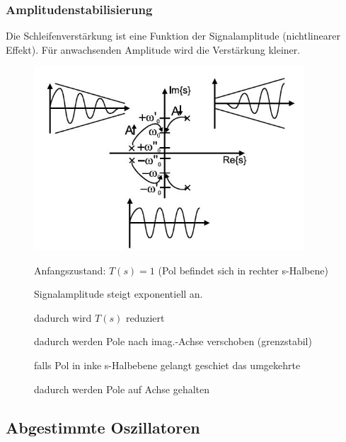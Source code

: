 \subsubsection{Amplitudenstabilisierung}
Die Schleifenverstärkung ist eine Funktion der Signalamplitude (nichtlinearer Effekt). Für anwachsenden Amplitude wird die Verstärkung kleiner. 
\begin{figure}[h!]
	\begin{minipage}{0.4\textwidth} 
	  \includegraphics[width=0.9\textwidth]{images/Pollage_Regelung}
	\end{minipage}
	\begin{minipage}{0.5\textwidth}
      \begin{compactenum}
        \item Anfangszustand: $T(s)=1$ (Pol befindet sich in rechter s-Halbene)
        \item Signalamplitude steigt exponentiell an.
        \item dadurch wird $T(s)$ reduziert
        \item dadurch werden Pole nach imag.-Achse verschoben (grenzstabil)
        \item falls Pol in inke s-Halbebene gelangt geschiet das umgekehrte
        \item dadurch werden Pole auf Achse gehalten
      \end{compactenum}
	\end{minipage}
\end{figure}

\FloatBarrier
\subsection{Abgestimmte Oszillatoren}
